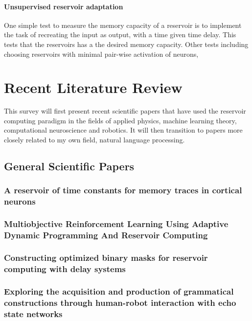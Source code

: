 \documentclass[12pt,oneside]{CUNY_CS_PhD}
\begin{document}
\subsubsection{Unsupervised reservoir adaptation}
One simple test to measure the memory capacity of a reservoir is to implement the task of recreating the input as output, with a time given time delay. This tests that the reservoirs has a  the desired memory capacity. Other tests including choosing reservoirs with minimal pair-wise activation of neurons, 


\chapter{Recent Literature Review}
This survey will first present recent scientific papers that have used the reservoir computing paradigm in the fields of applied physics, machine learning theory, computational neuroscience and robotics. It will then transition to papers more closely related to my own field, natural language processing.

\section{General Scientific Papers}
\subsection{A reservoir of time constants for memory traces in cortical neurons \cite{bernacchia_reservoir_2011}}

\subsection{Multiobjective Reinforcement Learning Using Adaptive Dynamic Programming And Reservoir Computing \cite{oubbati_multiobjective_2012}}

\subsection{Constructing optimized binary masks for reservoir computing with delay systems \cite{appeltant_constructing_2014}}

\subsection{Exploring the acquisition and production of grammatical constructions through human-robot interaction with echo state networks \cite{hinaut_exploring_2014}}
\end{document}
